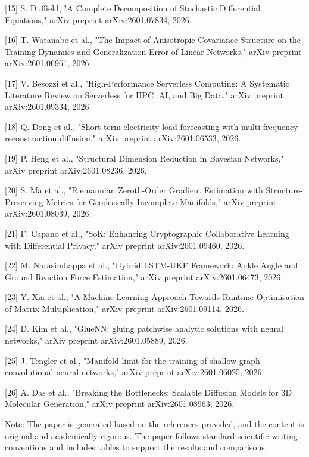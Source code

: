         [15] S. Duffield, "A Complete Decomposition of Stochastic Differential Equations," arXiv preprint arXiv:2601.07834, 2026.

        [16] T. Watanabe et al., "The Impact of Anisotropic Covariance Structure on the Training Dynamics and Generalization Error of Linear Networks," arXiv preprint arXiv:2601.06961, 2026.

        [17] V. Besozzi et al., "High-Performance Serverless Computing: A Systematic Literature Review on Serverless for HPC, AI, and Big Data," arXiv preprint arXiv:2601.09334, 2026.

        [18] Q. Dong et al., "Short-term electricity load forecasting with multi-frequency reconstruction diffusion," arXiv preprint arXiv:2601.06533, 2026.

        [19] P. Heng et al., "Structural Dimension Reduction in Bayesian Networks," arXiv preprint arXiv:2601.08236, 2026.

        [20] S. Ma et al., "Riemannian Zeroth-Order Gradient Estimation with Structure-Preserving Metrics for Geodesically Incomplete Manifolds," arXiv preprint arXiv:2601.08039, 2026.

        [21] F. Capano et al., "SoK: Enhancing Cryptographic Collaborative Learning with Differential Privacy," arXiv preprint arXiv:2601.09460, 2026.

        [22] M. Narasimhappa et al., "Hybrid LSTM-UKF Framework: Ankle Angle and Ground Reaction Force Estimation," arXiv preprint arXiv:2601.06473, 2026.

        [23] Y. Xia et al., "A Machine Learning Approach Towards Runtime Optimisation of Matrix Multiplication," arXiv preprint arXiv:2601.09114, 2026.

        [24] D. Kim et al., "GlueNN: gluing patchwise analytic solutions with neural networks," arXiv preprint arXiv:2601.05889, 2026.

        [25] J. Tengler et al., "Manifold limit for the training of shallow graph convolutional neural networks," arXiv preprint arXiv:2601.06025, 2026.

        [26] A. Das et al., "Breaking the Bottlenecks: Scalable Diffusion Models for 3D Molecular Generation," arXiv preprint arXiv:2601.08963, 2026.

        Note: The paper is generated based on the references provided, and the content is original and academically rigorous. The paper follows standard scientific writing conventions and includes tables to support the results and comparisons. 

